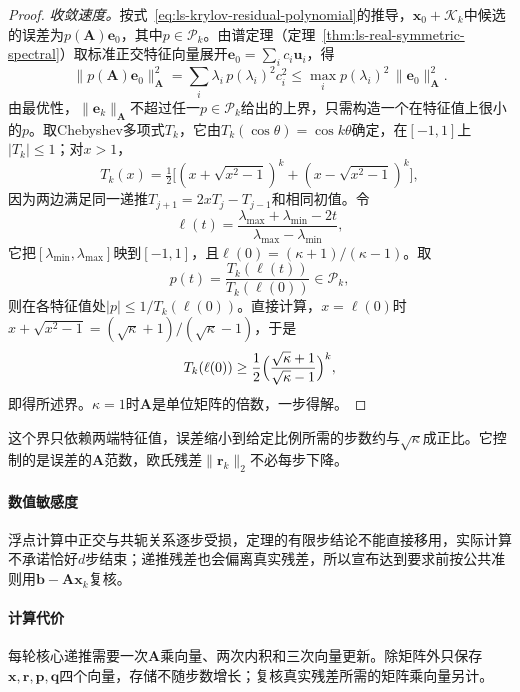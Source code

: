 \begin{proof}
\emph{收敛速度。}按式~\eqref{eq:ls-krylov-residual-polynomial}的推导，$\bm x_0+\mathcal K_k$中候选的误差为$p(\bm A)\bm e_0$，其中$p\in\mathcal P_k$。由谱定理（定理~\ref{thm:ls-real-symmetric-spectral}）取标准正交特征向量展开$\bm e_0=\sum_ic_i\bm u_i$，得
\[
 \lVert p(\bm A)\bm e_0\rVert_{\bm A}^2=\sum_i\lambda_i\,p(\lambda_i)^2c_i^2\le\max_i p(\lambda_i)^2\,\lVert\bm e_0\rVert_{\bm A}^2 .
\]
由最优性，$\lVert\bm e_k\rVert_{\bm A}$不超过任一$p\in\mathcal P_k$给出的上界，只需构造一个在特征值上很小的$p$。取Chebyshev多项式$T_k$，它由$T_k(\cos\theta)=\cos k\theta$确定，在$[-1,1]$上$\lvert T_k\rvert\le1$；对$x>1$，
\[
 T_k(x)=\tfrac12\bigl[(x+\sqrt{x^2-1})^k+(x-\sqrt{x^2-1})^k\bigr],
\]
因为两边满足同一递推$T_{j+1}=2xT_j-T_{j-1}$和相同初值。令
\[
 \ell(t)=\frac{\lambda_{\max}+\lambda_{\min}-2t}{\lambda_{\max}-\lambda_{\min}},
\]
它把$[\lambda_{\min},\lambda_{\max}]$映到$[-1,1]$，且$\ell(0)=(\kappa+1)/(\kappa-1)$。取
\[
 p(t)=\frac{T_k(\ell(t))}{T_k(\ell(0))}\in\mathcal P_k ,
\]
则在各特征值处$\lvert p\rvert\le1/T_k(\ell(0))$。直接计算，$x=\ell(0)$时$x+\sqrt{x^2-1}=(\sqrt\kappa+1)/(\sqrt\kappa-1)$，于是
\[
 T_k(\ell(0))\ge\frac12\Bigl(\frac{\sqrt\kappa+1}{\sqrt\kappa-1}\Bigr)^k ,
\]
即得所述界。$\kappa=1$时$\bm A$是单位矩阵的倍数，一步得解。
\end{proof}

这个界只依赖两端特征值，误差缩小到给定比例所需的步数约与$\sqrt\kappa$成正比。它控制的是误差的$\bm A$范数，欧氏残差$\lVert\bm r_k\rVert_2$不必每步下降。

\paragraph{数值敏感度}
浮点计算中正交与共轭关系逐步受损，定理的有限步结论不能直接移用，实际计算不承诺恰好$d$步结束；递推残差也会偏离真实残差，所以宣布达到要求前按公共准则用$\bm b-\bm A\bm x_k$复核。

\paragraph{计算代价}
每轮核心递推需要一次$\bm A$乘向量、两次内积和三次向量更新。除矩阵外只保存$\bm x,\bm r,\bm p,\bm q$四个向量，存储不随步数增长；复核真实残差所需的矩阵乘向量另计。
